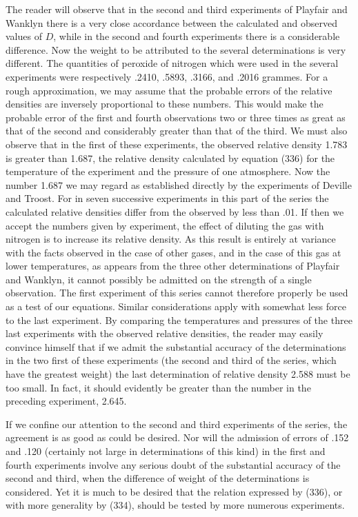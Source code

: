 \documentclass[12pt]{memoir}
\begin{document}
The reader will observe that in the second and third experiments of Playfair and Wanklyn there is a very close accordance between the calculated and observed values of $D$, while in the second and fourth experiments there is a considerable difference. Now the weight to be attributed to the several determinations is very different. The quantities of peroxide of nitrogen which were used in the several experiments were respectively .2410, .5893, .3166, and .2016 grammes. For a rough approximation, we may assume that the probable errors of the relative densities are inversely proportional to these numbers. This would make the probable error of the first and fourth observations two or three times as great as that of the second and considerably greater than that of the third. We must also observe that in the first of these experiments, the observed relative density 1.783 is greater than 1.687, the relative density calculated by equation (336) for the temperature of the experiment and the pressure of one atmosphere. Now the number 1.687 we may regard as established directly by the experiments of Deville and Troost. For in seven successive experiments in this part of the series the calculated relative densities differ from the observed by less than .01. If then we accept the numbers given by experiment, the effect of diluting the gas with nitrogen is to increase its relative density. As this result is entirely at variance with the facts observed in the case of other gases, and in the case of this gas at lower temperatures, as appears from the three other determinations of Playfair and Wanklyn, it cannot possibly be admitted on the strength of a single observation. The first experiment of this series cannot therefore properly be used as a test of our equations. Similar considerations apply with somewhat less force to the last experiment. By comparing the temperatures and pressures of the three last experiments with the observed relative densities, the reader may easily convince himself that if we admit the substantial accuracy of the determinations in the two first of these experiments (the second and third of the series, which have the greatest weight) the last determination of relative density 2.588 must be too small. In fact, it should evidently be greater than the number in the preceding experiment, 2.645.

If we confine our attention to the second and third experiments of the series, the agreement is as good as could be desired. Nor will the admission of errors of .152 and .120 (certainly not large in determinations of this kind) in the first and fourth experiments involve any serious doubt of the substantial accuracy of the second and third, when the difference of weight of the determinations is considered. Yet it is much to be desired that the relation expressed by (336), or with more generality by (334), should be tested by more numerous experiments.
\end{document}
